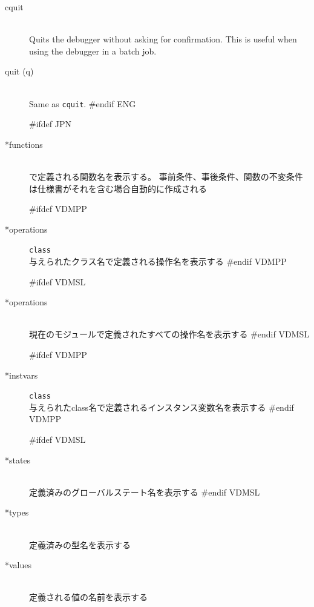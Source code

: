 \documentclass[\pformat,12pt]{article}
\newcommand{\Toolbox}{Toolbox}
\newcommand{\Toolbox}{Toolbox}
\begin{document}
\begin{description}
\item[cquit]  \mbox{}\\
  Quits the debugger without asking for confirmation.  This is useful
  when using the debugger in a batch job.

\item[quit (q)] \mbox{}\\
  Same as {\tt cquit}.
#endif ENG

#ifdef JPN
\item[*functions]  \mbox{}\\ 
  で定義される関数名を表示する。
  事前条件、事後条件、関数の不変条件は仕様書がそれを含む場合自動的に作成される

#ifdef VDMPP
\item[*operations] {\tt class}\mbox{}\\
  与えられたクラス名で定義される操作名を表示する
#endif VDMPP

#ifdef VDMSL
\item[*operations] \mbox{}\\
  現在のモジュールで定義されたすべての操作名を表示する
#endif VDMSL

#ifdef VDMPP
\item[*instvars] {\tt class}\mbox{}\\
  与えられたclass名で定義されるインスタンス変数名を表示する
#endif VDMPP

#ifdef VDMSL
\item[*states]\mbox{}\\
  定義済みのグローバルステート名を表示する
#endif VDMSL

\item[*types] \mbox{}\\ 
  定義済みの型名を表示する

\item[*values] \mbox{}\\ 
  定義される値の名前を表示する


\end{description}
\end{document}
